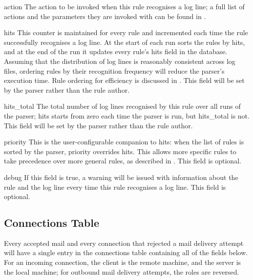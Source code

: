 \begin{boldeqlist}
    \item [action] The action to be invoked when this rule recognises a log
        line; a full list of actions and the parameters they are invoked
        with can be found in .

    \item [hits] This counter is maintained for every rule and incremented
        each time the rule successfully recognises a log line.  At the
        start of each run \parsername{} sorts the rules by hits, and at the end of the run it updates
        every rule's hits field in the database.  Assuming that the
        distribution of log lines is reasonably consistent across log
        files, ordering rules by their recognition frequency will reduce
        the parser's execution time.  Rule ordering for efficiency is
        discussed in .  This field
        will be set by the parser rather than the rule author.

    \item [hits\_total] The total number of log lines recognised by this
        rule over all runs of the parser; hits starts from zero each time
        the parser is run, but hits\_total is not.  This field will be set
        by the parser rather than the rule author.

    \item [priority] This is the user-configurable companion to hits: when
        the list of rules is sorted by the parser, priority overrides hits.
        This allows more specific rules to take precedence over more
        general rules, as described in .
        This field is optional.

    \item [debug] If this field is true, a warning will be issued with
        information about the rule and the log line every time this rule
        recognises a log line.  This field is optional.

\end{boldeqlist}

\subsection{Connections Table}

\label{connections table}

Every accepted mail and every connection that rejected a mail delivery
attempt will have a single entry in the connections table containing all of
the fields below.  For an incoming connection, the client is the remote
machine, and the server is the local machine; for outbound mail delivery
attempts, the roles are reversed.

